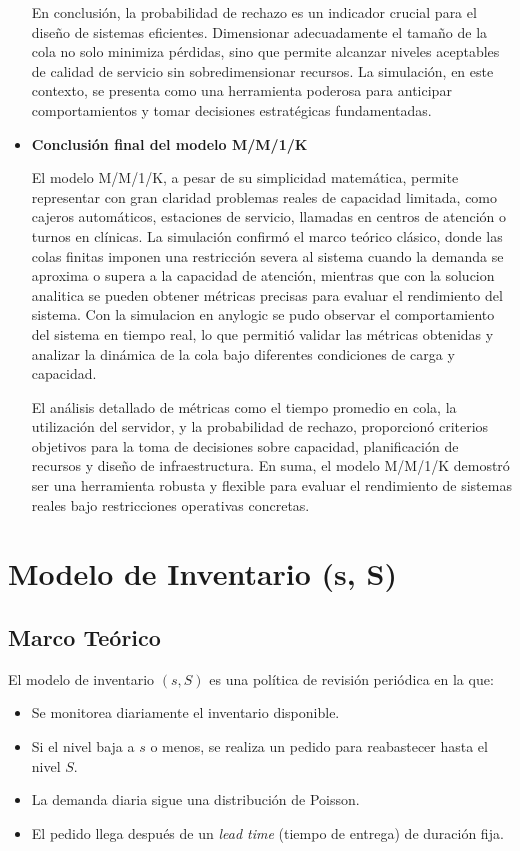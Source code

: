 \documentclass[12pt]{article}
\begin{document}
\begin{itemize}
    En conclusión, la probabilidad de rechazo es un indicador crucial para el diseño de sistemas eficientes. Dimensionar adecuadamente el tamaño de la cola no solo minimiza pérdidas, sino que permite alcanzar niveles aceptables de calidad de servicio sin sobredimensionar recursos. La simulación, en este contexto, se presenta como una herramienta poderosa para anticipar comportamientos y tomar decisiones estratégicas fundamentadas.
    \item \textbf{Conclusión final del modelo M/M/1/K}\par
    El modelo M/M/1/K, a pesar de su simplicidad matemática, permite representar con gran claridad problemas reales de capacidad limitada, como cajeros automáticos, estaciones de servicio, llamadas en centros de atención o turnos en clínicas. La simulación confirmó el marco teórico clásico, donde las colas finitas imponen una restricción severa al sistema cuando la demanda se aproxima o supera a la capacidad de atención, mientras que con la solucion analitica se pueden obtener métricas precisas para evaluar el rendimiento del sistema. Con la simulacion en anylogic se pudo observar el comportamiento del sistema en tiempo real, lo que permitió validar las métricas obtenidas y analizar la dinámica de la cola bajo diferentes condiciones de carga y capacidad.

    El análisis detallado de métricas como el tiempo promedio en cola, la utilización del servidor, y la probabilidad de rechazo, proporcionó criterios objetivos para la toma de decisiones sobre capacidad, planificación de recursos y diseño de infraestructura. En suma, el modelo M/M/1/K demostró ser una herramienta robusta y flexible para evaluar el rendimiento de sistemas reales bajo restricciones operativas concretas.


\end{itemize}

\section{Modelo de Inventario (s, S)}

\subsection{Marco Teórico}

El modelo de inventario $(s, S)$ es una política de revisión periódica en la que:
\begin{itemize}
    \item Se monitorea diariamente el inventario disponible.
    \item Si el nivel baja a $s$ o menos, se realiza un pedido para reabastecer hasta el nivel $S$.
    \item La demanda diaria sigue una distribución de Poisson.
    \item El pedido llega después de un \textit{lead time} (tiempo de entrega) de duración fija.
\end{itemize}
\end{document}
